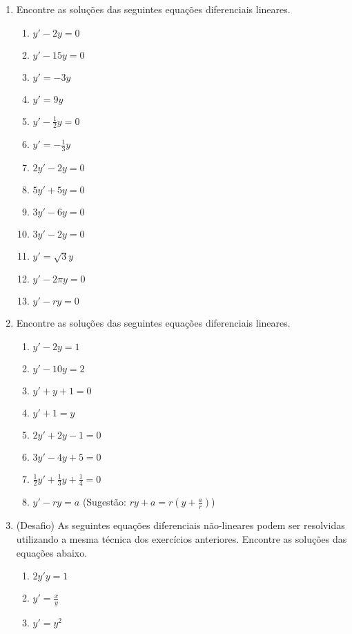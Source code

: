 \documentclass[a4paper]{article}
\begin{document}
\begin{enumerate}
\item Encontre as soluções das seguintes equações diferenciais lineares.

  \begin{enumerate}
  \item $y' -2y = 0$
  \item $y' -15y = 0$
  \item $y' = -3y$
  \item $y' = 9y$
  \item $y' - \frac{1}{2} y = 0$
  \item $y' = -\frac{1}{3} y$
  \item $2y' - 2y = 0$
  \item $5y' +5y =0 $
  \item $3y' -6y = 0 $
  \item $3y' -2y =0$
  \item $y' = \sqrt{3}y$
  \item $y' -2\pi y =0$
  \item $y' - ry = 0$
  \end{enumerate}


\item Encontre as soluções das seguintes equações diferenciais lineares.

  \begin{enumerate}
  \item $y' - 2y = 1$
  \item $y' - 10y = 2$
  \item $y' + y + 1 = 0$
  \item $y' + 1 = y$
  \item $2y' + 2y -1 = 0$
  \item $3y'- 4y +5 = 0$
  \item $\frac{1}{2} y' + \frac{1}{3} y + \frac{1}{4} = 0$
  \item $y' -ry = a$ (Sugestão: $ry+a = r(y+\frac{a}{r})$)
  \end{enumerate}

\item (Desafio) As seguintes equações diferenciais não-lineares podem
  ser resolvidas utilizando a mesma técnica dos exercícios
  anteriores. Encontre as soluções das equações abaixo.

  \begin{enumerate}
  \item $2y'y = 1$
  \item $y' = \frac{x}{y}$
  \item $y' = y^2$
  \end{enumerate}
\end{enumerate}
\end{document}
